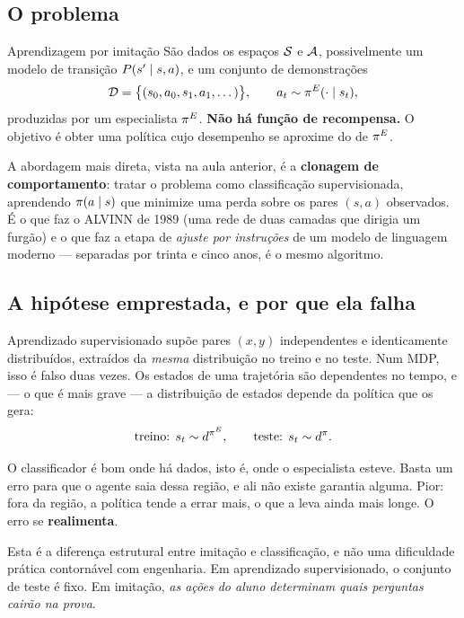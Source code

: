 \documentclass[11pt, a4paper]{article}
\newcommand{\polE}{\pol^{E}}
\newcommand{\Dset}{\mathcal{D}}
\begin{document}
\subsection{O problema}

\begin{defbox}{Aprendizagem por imitação}
São dados os espaços $\mathcal{S}$ e $\mathcal{A}$, possivelmente um modelo de transição
$P(s'\mid s,a)$, e um conjunto de demonstrações
\[
  \Dset = \bigl\{(s_0, a_0, s_1, a_1, \dots)\bigr\},
  \qquad a_t \sim \polE(\cdot \mid s_t),
\]
produzidas por um especialista $\polE$. \textbf{Não há função de recompensa.} O
objetivo é obter uma política cujo desempenho se aproxime do de $\polE$.
\end{defbox}

A abordagem mais direta, vista na aula anterior, é a \textbf{clonagem de
comportamento}: tratar o problema como classificação supervisionada, aprendendo
$\pi(a\mid s)$ que minimize uma perda sobre os pares $(s,a)$ observados. É o
que faz o ALVINN de 1989 (uma rede de duas camadas que dirigia um furgão) e o
que faz a etapa de \emph{ajuste por instruções} de um modelo de linguagem
moderno --- separadas por trinta e cinco anos, é o mesmo algoritmo.

\subsection{A hipótese emprestada, e por que ela falha}

Aprendizado supervisionado supõe pares $(x,y)$ independentes e identicamente
distribuídos, extraídos da \emph{mesma} distribuição no treino e no teste. Num
MDP, isso é falso duas vezes. Os estados de uma trajetória são dependentes no
tempo, e --- o que é mais grave --- a distribuição de estados depende da
política que os gera:
\[
  \text{treino: } s_t \sim d^{\polE},
  \qquad
  \text{teste: } s_t \sim d^{\pol}.
\]

O classificador é bom onde há dados, isto é, onde o especialista esteve. Basta
um erro para que o agente saia dessa região, e ali não existe garantia alguma.
Pior: fora da região, a política tende a errar mais, o que a leva ainda mais
longe. O erro se \textbf{realimenta}.

\begin{alertabox}
Esta é a diferença estrutural entre imitação e classificação, e não uma
dificuldade prática contornável com engenharia. Em aprendizado supervisionado, o
conjunto de teste é fixo. Em imitação, \emph{as ações do aluno determinam quais
perguntas cairão na prova}.
\end{alertabox}
\end{document}
